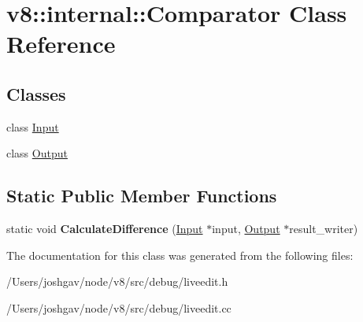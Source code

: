\hypertarget{classv8_1_1internal_1_1_comparator}{}\section{v8\+:\+:internal\+:\+:Comparator Class Reference}
\label{classv8_1_1internal_1_1_comparator}
\subsection*{Classes}
\begin{DoxyCompactItemize}
\item 
class \hyperlink{classv8_1_1internal_1_1_comparator_1_1_input}{Input}
\item 
class \hyperlink{classv8_1_1internal_1_1_comparator_1_1_output}{Output}
\end{DoxyCompactItemize}
\subsection*{Static Public Member Functions}
\begin{DoxyCompactItemize}
\item 
static void {\bfseries Calculate\+Difference} (\hyperlink{classv8_1_1internal_1_1_comparator_1_1_input}{Input} $\ast$input, \hyperlink{classv8_1_1internal_1_1_comparator_1_1_output}{Output} $\ast$result\+\_\+writer)\hypertarget{classv8_1_1internal_1_1_comparator_a89c50d6f12242f6aed16be0efa54e9e6}{}\label{classv8_1_1internal_1_1_comparator_a89c50d6f12242f6aed16be0efa54e9e6}

\end{DoxyCompactItemize}


The documentation for this class was generated from the following files\+:\begin{DoxyCompactItemize}
\item 
/\+Users/joshgav/node/v8/src/debug/liveedit.\+h\item 
/\+Users/joshgav/node/v8/src/debug/liveedit.\+cc\end{DoxyCompactItemize}
